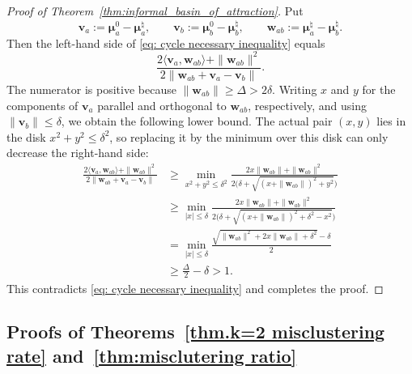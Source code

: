 \documentclass{article}
\theoremstyle{plain}
\newtheorem{lemma}[theorem]{Lemma}
\theoremstyle{definition}
\newcommand{\1}{\mathbf{1}}
\newcommand{\bmu}{\bm{\mu}}
\begin{document}
\begin{proof}[Proof of Theorem~\ref{thm:informal_basin_of_attraction}]
Put
\[
\bm{v}_a:=\bmu_a^0-\bmu^\natural_a,
\qquad
\bm{v}_b:=\bmu_b^0-\bmu^\natural_b,
\qquad
\bm{w}_{ab}:=\bmu^\natural_a-\bmu^\natural_b.
\]
Then the left-hand side of \eqref{eq: cycle necessary inequality} equals
\[
\frac{2\langle\bm{v}_a,\bm{w}_{ab}\rangle+\|\bm{w}_{ab}\|^2}
{2\|\bm{w}_{ab}+\bm{v}_a-\bm{v}_b\|}.
\]
The numerator is positive because $\|\bm{w}_{ab}\|\geq\Delta>2\delta$.
Writing $x$ and $y$ for the components of $\bm{v}_a$ parallel and orthogonal to $\bm{w}_{ab}$, respectively, and using $\|\bm{v}_b\|\leq\delta$, we obtain the following lower bound.
The actual pair $(x,y)$ lies in the disk $x^2+y^2\leq\delta^2$, so replacing it by the minimum over this disk can only decrease the right-hand side:
\begin{align*}
\frac{2\langle\bm{v}_a,\bm{w}_{ab}\rangle+\|\bm{w}_{ab}\|^2}
{2\|\bm{w}_{ab}+\bm{v}_a-\bm{v}_b\|}
&\geq
\min_{x^2+y^2\leq\delta^2}
\frac{2x\|\bm{w}_{ab}\|+\|\bm{w}_{ab}\|^2}
{2\big(\delta+\sqrt{(x+\|\bm{w}_{ab}\|)^2+y^2}\big)}\\
&\geq
\min_{|x|\leq\delta}
\frac{2x\|\bm{w}_{ab}\|+\|\bm{w}_{ab}\|^2}
{2\big(\delta+\sqrt{(x+\|\bm{w}_{ab}\|)^2+\delta^2-x^2}\big)}\\
&=
\min_{|x|\leq\delta}
\frac{\sqrt{\|\bm{w}_{ab}\|^2+2x\|\bm{w}_{ab}\|+\delta^2}-\delta}{2}\\
&\geq\frac{\Delta}{2}-\delta
>1.
\end{align*}
This contradicts \eqref{eq: cycle necessary inequality} and completes the proof.
\end{proof}

\subsection{Proofs of Theorems~\ref{thm.k=2 misclustering rate} and~\ref{thm:misclutering ratio}}
\label{sec: probabilistic conditions}


\end{document}
